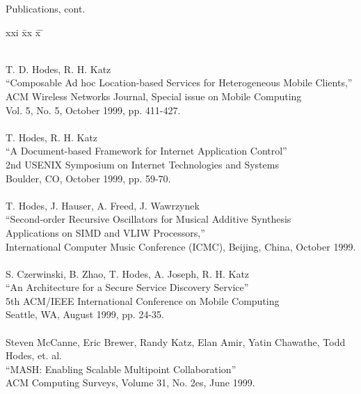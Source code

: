 \newpage
\begin{bf} \large
Publications, cont.
\end{bf}
\begin{tabbing}
xxi \= xx \= x \= \kill

\smallskip \\[-3pt]
\>    T. D. Hodes, R. H. Katz \\
\>\>      ``Composable Ad hoc Location-based Services for Heterogeneous
             Mobile Clients,'' \\
\>\>       ACM Wireless Networks Journal, Special issue on Mobile Computing \\
\>\>       Vol. 5, No. 5, October 1999, pp. 411-427. \\
\smallskip \\[-3pt]
\>    T. Hodes, R. H. Katz \\
\>\>      ``A Document-based Framework for Internet Application Control'' \\
\>\>       2nd USENIX Symposium on Internet Technologies and Systems \\
\>\>       Boulder, CO, October 1999, pp. 59-70. \\
\smallskip \\[-3pt]
\>    T. Hodes, J. Hauser, A. Freed, J. Wawrzynek\\
\>\>      ``Second-order Recursive Oscillators for Musical Additive Synthesis \\
\>\>\>        Applications on SIMD and VLIW Processors,'' \\
\>\>       International Computer Music Conference (ICMC), Beijing, China, October 1999. \\
\smallskip \\[-3pt]
\>    S. Czerwinski, B. Zhao, T. Hodes, A. Joseph, R. H. Katz \\
\>\>      ``An Architecture for a Secure Service Discovery Service'' \\
\>\>       5th ACM/IEEE International Conference on Mobile Computing \\
\>\>       Seattle, WA, August 1999, pp. 24-35. \\
\smallskip \\[-3pt]
\>    Steven McCanne, Eric Brewer, Randy Katz, Elan Amir, Yatin Chawathe,
    Todd Hodes, et. al. \\
\>\>      ``MASH: Enabling Scalable Multipoint Collaboration'' \\
\>\>       ACM Computing Surveys, Volume 31, No. 2es, June 1999. \\

\end{tabbing}
